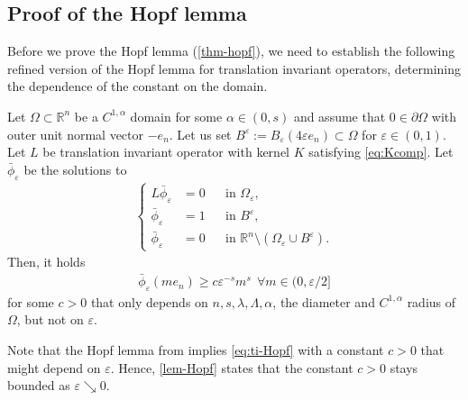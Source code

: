 \documentclass[11pt,reqno]{amsart}
\theoremstyle{plain}
\theoremstyle{definition}
\numberwithin{equation}{section}
\newcommand{\R}{\mathbb{R}}
\newcommand{\eps}{\varepsilon}
\newcommand{\1}{\mathbbm{1}}
\begin{document}
\subsection{Proof of the Hopf lemma}


Before we prove the Hopf lemma (\autoref{thm-hopf}), we need to establish the following refined version of the Hopf lemma for translation invariant operators, determining the dependence of the constant on the domain.

\begin{lemma}\label{lem-Hopf}
Let $\Omega \subset \R^n$ be a $C^{1,\alpha}$ domain for some $\alpha \in (0, s)$ and assume that $0 \in \partial \Omega$ with outer unit normal vector $-e_n$. Let us set $B^{\eps} := B_{\eps}(4\eps e_n) \subset \Omega$ for $\eps \in (0,1)$. Let $L$ be translation invariant operator with kernel $K$ satisfying \eqref{eq:Kcomp}. Let $\bar{\phi}_{\eps}$ be the solutions to
    \begin{align*}
    \left\{
    \begin{aligned}
    L \bar{\phi}_{\eps}&=0 &&\text{in }\Omega_{\eps}, \\
    \bar{\phi}_{\eps}&=1 &&\text{in }B^{\eps}, \\
    \bar{\phi}_{\eps}&=0 &&\text{in }\R^n \setminus (\Omega_{\eps} \cup B^{\eps}).
    \end{aligned}
    \right.
    \end{align*}
    Then, it holds
    \begin{align}
    \label{eq:ti-Hopf}
        \bar{\phi}_{\eps}(m e_n)\ge c \eps^{-s} m^s ~~ \forall m \in (0,\eps/2]
    \end{align}
    for some $c > 0$ that only depends on $n,s,\lambda,\Lambda,\alpha$, the diameter and $C^{1,\alpha}$ radius of $\Omega$, but not on $\eps$.
\end{lemma}

Note that the Hopf lemma from \cite[Theorem 6.10]{RoWe24} implies \eqref{eq:ti-Hopf} with a constant $c > 0$ that might depend on $\eps$. Hence, \autoref{lem-Hopf} states that the constant $c > 0$ stays bounded as $\eps \searrow 0$. 
\end{document}
